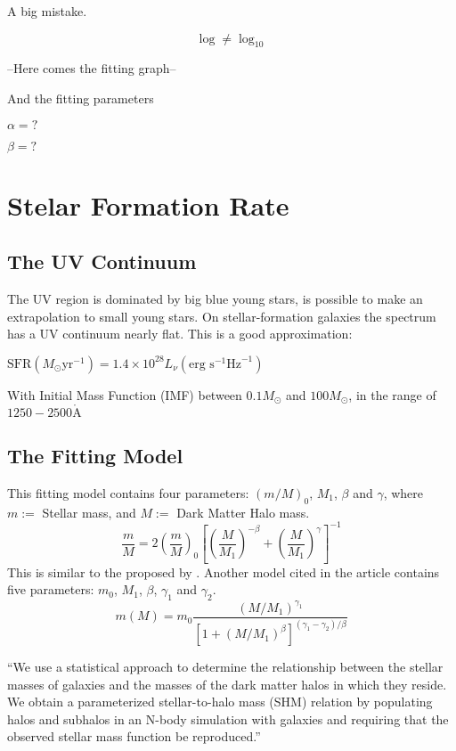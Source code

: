 \documentclass[manuscript]{aastex}
\begin{document}
  \huge
  A big mistake.

  \[\log \neq \log_{10}\]
  \normalsize

  --Here comes the fitting graph--

  And the fitting parameters

  $\alpha = ?$

  $\beta = ?$

\section{Stelar Formation Rate}

  \subsection{The UV Continuum}
  The UV region is dominated by big blue young stars, 
  is possible to make an extrapolation to small young stars\citep{kennicutt98}.
  On stellar-formation galaxies the spectrum has a 
  UV continuum nearly flat. This is a good approximation:

  $ \textrm{SFR}\left(M_\odot \textrm{yr}^{-1}\right) 
      = 1.4 \times 10^{28} L_{\nu} \left( \textrm{erg s}^{-1}\textrm{Hz}^{-1} \right)$

  With Initial Mass Function (IMF) between $0.1 M_\odot$ 
  and $100 M_\odot$, in the range of $1250-2500 \mathring{\textrm{A}} $


  \subsection{The Fitting Model}

  This fitting model contains four parameters: $\left(m/M\right)_0$, $M_1$, $\beta$ and $\gamma$, 
  where $m:=$ Stellar mass, and $M :=$ Dark Matter Halo mass.
  \begin{equation}
  \frac{m}{M} = 2 \left( \frac{m}{M} \right)_{0} 
		    \left[ \left(\frac{M}{M_1}\right)^{-\beta} + \left(\frac{M}{M_1}\right)^{\gamma} \right]^{-1} 
  \end{equation}
  This is similar to the proposed by \cite{moster10}.
  Another model cited in the article contains five parameters: $m_0$, $M_1$, $\beta$, $\gamma_1$ and $\gamma_2$.
  \[ m(M) = m_0 \frac{ (M/M_1)^{\gamma_1}}{ \left[ 1 + (M/M_1)^\beta \right]^{ (\gamma_1-\gamma_2)/\beta}} \]


   ``We use a statistical approach to determine the relationship between the stellar masses of galaxies and the masses
  of the dark matter halos in which they reside. We obtain a parameterized stellar-to-halo mass (SHM) relation by
  populating halos and subhalos in an N-body simulation with galaxies and requiring that the observed stellar mass
  function be reproduced.'' \citep{moster10}
\end{document}
